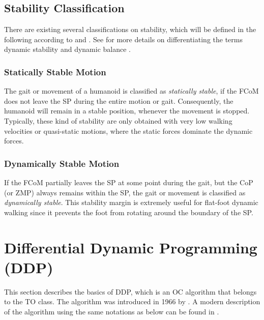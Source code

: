 \subsection{Stability Classification}
There are existing several classifications on stability, which will be defined in the following according to \cite[Sec.1.2.1]{westervelt2018feedback} and \cite{garcia2002classification}. See \citeauthor{vukobratovic2007towards} for more details on differentiating the terms dynamic stability and dynamic balance \cite{vukobratovic2007towards}.  
\subsubsection{Statically Stable Motion}
The gait or movement of a humanoid is classified as \textit{statically stable}, if the \gls{FCoM} does not leave the \gls{SP} during the entire motion or gait. Consequently, the humanoid will remain in a stable position, whenever the movement is stopped. Typically, these kind of stability are only obtained with very low walking velocities or quasi-static motions, where the static forces dominate the dynamic forces.  
\subsubsection{Dynamically Stable Motion}
If the \gls{FCoM} partially leaves the \gls{SP} at some point during the gait, but the \gls{CoP} (or \gls{ZMP}) always remains within the \gls{SP}, the gait or movement is classified as \textit{dynamically stable}. This stability margin is extremely useful for flat-foot dynamic walking since it prevents the foot from rotating around the boundary of the \gls{SP}. 


\section{Differential Dynamic Programming (DDP)}\label{sec:DDP}
This section describes the basics of \gls{DDP}, which is an \gls{OC} algorithm that belongs to the \gls{TO} class. The algorithm was introduced in 1966 by \citeauthor{mayne1966} \citep{mayne1966}. A modern description of the algorithm using the same notations as below can be found in \cite{tassa2012synthesis, tassa2014control}.
